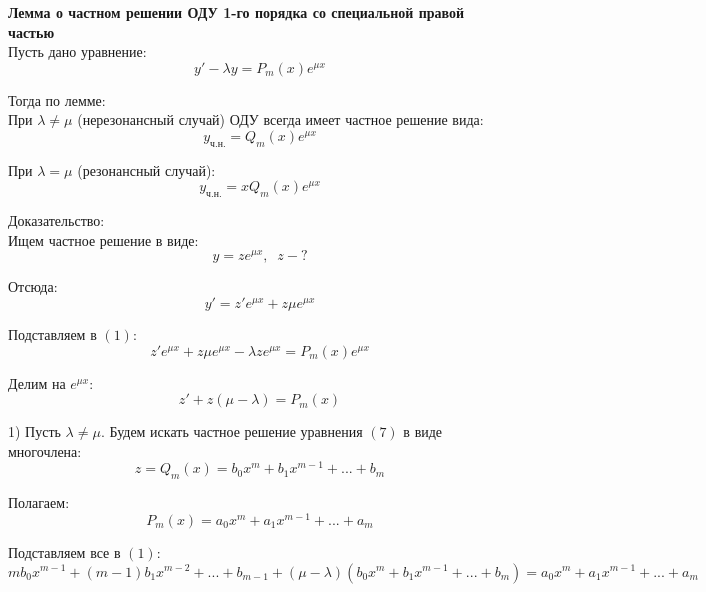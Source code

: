 \documentclass{article}
\begin{document}
	\textbf{Лемма о частном решении ОДУ 1-го порядка со специальной правой частью}\\

	Пусть дано уравнение:
	\begin{equation}
		y' - \lambda y = P_m(x)e^{\mu x}
	\end{equation}

	Тогда по лемме:\\

	При $\lambda\neq\mu$ (нерезонансный случай) ОДУ всегда имеет частное решение вида:
	\begin{equation}
		y_\text{ч.н.} = Q_m(x)e^{\mu x}
	\end{equation}

	При $\lambda = \mu$ (резонансный случай):
	\begin{equation}
		y_\text{ч.н.} = xQ_m(x)e^{\mu x}
	\end{equation}

	Доказательство:\\

	Ищем частное решение в виде:
	\begin{equation}
		y=ze^{\mu x},\;\;z - ?
	\end{equation}

	Отсюда:
	\begin{equation}
		y'=z'e^{\mu x} + z\mu e^{\mu x}
	\end{equation}

	Подставляем в $(1)$:
	\begin{equation}
		z'e^{\mu x} + z\mu e^{\mu x} - \lambda ze^{\mu x} = P_m(x)e^{\mu x}
	\end{equation}

	Делим на $e^{\mu x}$:
	\begin{equation}
		z' + z(\mu - \lambda) = P_m(x)
	\end{equation}

	1) Пусть $\lambda\neq\mu$. Будем искать частное решение уравнения $(7)$ в виде многочлена:
	\begin{equation}
		z=Q_m(x)=b_0x^m+b_1x^{m-1}+...+b_m
	\end{equation}

	Полагаем:
	\begin{equation}
		P_m(x)=a_0x^m+a_1x^{m-1}+...+a_m
	\end{equation}

	Подставляем все в $(1)$:
	\begin{equation}
		mb_0x^{m-1}+(m-1)b_1x^{m-2}+...+b_{m-1}+(\mu-\lambda)(b_0x^m+b_1x^{m-1}+...+b_m)=a_0x^m+a_1x^{m-1}+...+a_m
	\end{equation}
\end{document}
